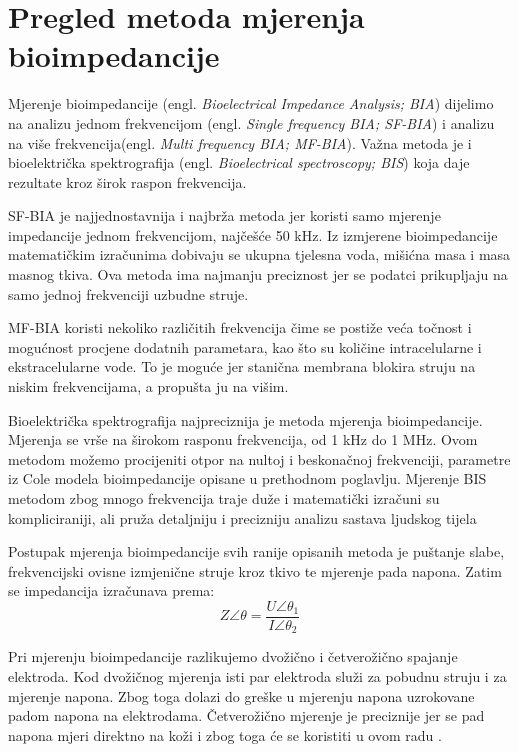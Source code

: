 \documentclass[../diplomski_rad.tex]{subfiles}
\begin{document}
\sloppy

\justifying

\section{Pregled metoda mjerenja bioimpedancije}

Mjerenje bioimpedancije (engl. \textit{Bioelectrical Impedance Analysis; BIA})  dijelimo na 
analizu jednom frekvencijom (engl. \textit{Single frequency BIA; SF-BIA}) 
i analizu na više frekvencija(engl. \textit{Multi frequency BIA; MF-BIA}). 
Važna metoda je i bioelektrička spektrografija (engl. \textit{Bioelectrical spectroscopy; BIS}) 
koja daje rezultate kroz širok raspon frekvencija. 

SF-BIA je najjednostavnija i najbrža metoda jer koristi samo mjerenje impedancije jednom frekvencijom, najčešće 50 kHz. 
Iz izmjerene bioimpedancije matematičkim izračunima dobivaju se ukupna tjelesna voda, mišićna masa i masa masnog tkiva. 
Ova metoda ima najmanju preciznost jer se podatci prikupljaju na samo jednoj frekvenciji uzbudne struje.

MF-BIA koristi nekoliko različitih frekvencija čime se postiže veća točnost i mogućnost procjene dodatnih parametara, 
kao što su količine intracelularne i ekstracelularne vode. To je moguće jer stanična membrana blokira struju na niskim frekvencijama, 
a propušta ju na višim. 

Bioelektrička spektrografija najpreciznija je metoda mjerenja bioimpedancije. 
Mjerenja se vrše na širokom rasponu frekvencija, od 1 kHz do 1 MHz.  
Ovom metodom možemo procijeniti otpor na nultoj i beskonačnoj frekvenciji, parametre iz Cole modela bioimpedancije 
opisane u prethodnom poglavlju. 
Mjerenje BIS metodom zbog mnogo frekvencija traje duže i matematički izračuni su kompliciraniji, 
ali pruža  detaljniju i precizniju analizu sastava ljudskog tijela

Postupak mjerenja bioimpedancije svih ranije opisanih metoda je puštanje slabe, 
frekvencijski ovisne izmjenične struje kroz tkivo te mjerenje pada napona. 
Zatim se impedancija izračunava prema:
\begin{equation}
    \label{jed:prvajednadzba}
    Z\angle\theta = \frac{U\angle\theta_{1}}{I\angle\theta_{2}} 
\end{equation} 

Pri mjerenju bioimpedancije razlikujemo dvožično i četverožično spajanje elektroda. 
Kod dvožičnog mjerenja isti par elektroda služi za pobudnu struju i za mjerenje napona. 
Zbog toga dolazi do greške u mjerenju napona uzrokovane padom napona na elektrodama. 
Četverožično mjerenje je preciznije jer se pad napona mjeri direktno na koži i zbog toga će se koristiti u ovom radu \cite{Abasi2022}. 
\end{document}
